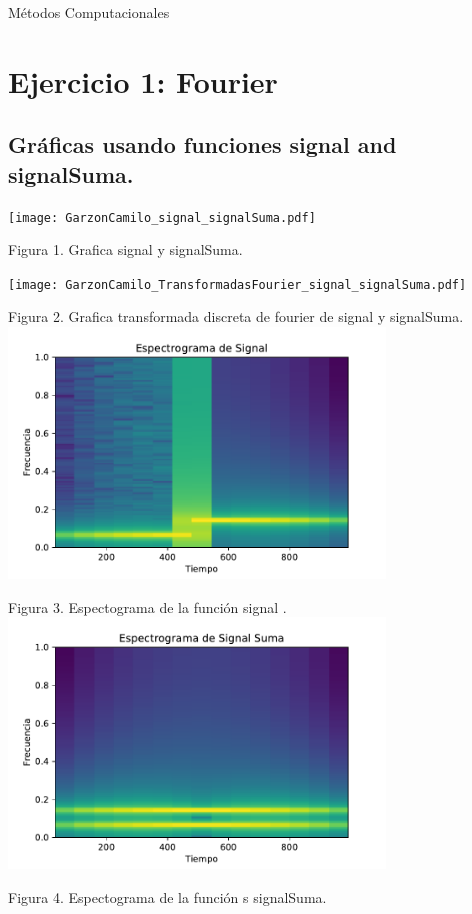 \documentclass[11pt,letterpaper]{exam}
\begin{document}
\begin{center}
{\Large Métodos Computacionales} 
\end{center}


\noindent
\section{Ejercicio 1: Fourier} 
\vspace{5mm}
\subsection{    Gráficas usando funciones signal and signalSuma.} 
\vspace{5mm}
\begin{center}
\texttt{[image: GarzonCamilo\_signal\_signalSuma.pdf]} 

Figura 1. Grafica signal y signalSuma.

\texttt{[image: GarzonCamilo\_TransformadasFourier\_signal\_signalSuma.pdf]} 

Figura 2. Grafica transformada discreta de fourier de signal y signalSuma.
\includegraphics[width=10cm]{GarzonCamilo_espectograma_signal.pdf} 


Figura 3. Espectograma de la función signal .
\includegraphics[width=10cm]{GarzonCamilo_espectograma_signalSuma.pdf} 


Figura 4. Espectograma de la función s signalSuma.
\end{center}
\vspace{5mm}
\end{document}
